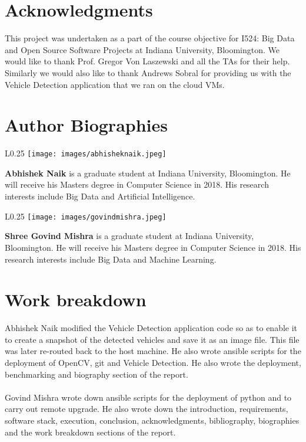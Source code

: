 \documentclass[9pt,twocolumn,twoside]{../../styles/osajnl}
\begin{document}
\section{Acknowledgments}
This project was undertaken as a part of the course objective for
I524: Big Data and Open Source Software Projects at Indiana
University, Bloomington.  We would like to thank Prof. Gregor Von
Laszewski and all the TAs for their help.  Similarly we would also
like to thank Andrews Sobral for providing us with the Vehicle
Detection application that we ran on the cloud VMs.



\section*{Author Biographies}
\begingroup \setlength\intextsep{0pt}
\begin{minipage}[t][3.2cm][t]{1.0\columnwidth}
  \begin{wrapfigure}{L}{0.25\columnwidth}
    \texttt{[image: images/abhisheknaik.jpeg]}
  \end{wrapfigure}
  \noindent
  {\bfseries Abhishek Naik} is a graduate student at Indiana
  University, Bloomington. He will receive his Masters degree in Computer Science in
  2018. His research interests include Big Data and Artificial Intelligence.
\end{minipage}
\begin{minipage}[t][3.2cm][t]{1.0\columnwidth}
  \begin{wrapfigure}{L}{0.25\columnwidth}
    \texttt{[image: images/govindmishra.jpeg]}
  \end{wrapfigure}
  \noindent
  {\bfseries Shree Govind Mishra} is a graduate student at Indiana
  University, Bloomington. He will receive his Masters degree in Computer Science in 2018. His
  research interests include Big Data and Machine Learning.
\end{minipage}
\endgroup \appendix

\section{Work breakdown}
Abhishek Naik modified the Vehicle Detection application code so as to enable it to create a snapshot of the detected vehicles and save it as an image file.  This file was later re-routed back to the host machine.  He also wrote ansible scripts for the deployment of OpenCV, git and Vehicle Detection.  He also wrote the deployment, benchmarking and biography section of the report.\\
\\
Govind Mishra wrote down ansible scripts for the deployment of python and to carry out remote upgrade. He also wrote down the introduction, requirements, software stack, execution, conclusion, acknowledgments, bibliography, biographies and the work breakdown sections of the report.
\end{document}
